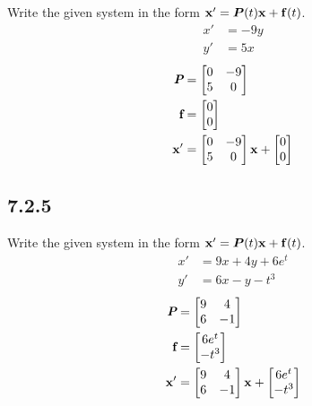 \documentclass{article}
\begin{document}
Write the given system in the form $ \vect{x}' = \matr{P}(t)\vect{x} + \vect{f}(t) $.
\begin{align*}
	x' & = -9y \\
	y' & = 5x
\end{align*}
\begin{align*}
	\matr{P} & =
		\begin{bmatrix}
			0 & -9 \\
			5 & 0
		\end{bmatrix} \\
	\vect{f} & = \begin{bmatrix} 0 \\ 0 \end{bmatrix} \\
	\vect{x}' & =
		\begin{bmatrix}
			0 & -9 \\
			5 & 0
		\end{bmatrix} \vect{x}
		+ \begin{bmatrix} 0 \\ 0 \end{bmatrix}
\end{align*}

\subsection{7.2.5}

Write the given system in the form $ \vect{x}' = \matr{P}(t)\vect{x} + \vect{f}(t) $.
\begin{align*}
	x' & = 9x + 4y + 6e^t \\
	y' & = 6x - y - t^3
\end{align*}
\begin{align*}
	\matr{P} & =
		\begin{bmatrix}
			9 & 4 \\
			6 & -1
		\end{bmatrix} \\
	\vect{f} & =
		\begin{bmatrix}
			6e^t \\
			-t^3
		\end{bmatrix} \\
	\vect{x}' & =
		\begin{bmatrix}
			9 & 4 \\
			6 & -1
		\end{bmatrix} \vect{x}
		+ \begin{bmatrix}
			6e^t \\
			-t^3
		\end{bmatrix}
\end{align*}
\end{document}
